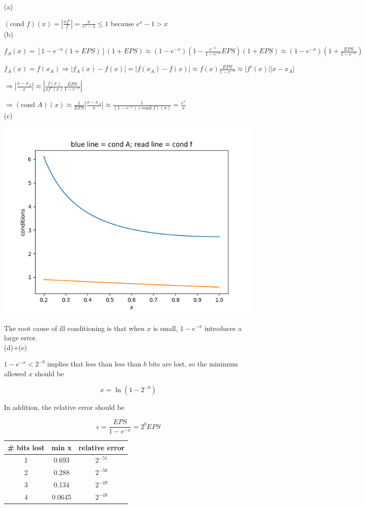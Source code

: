 \documentclass[10pt]{article}
\begin{document}
(a) 

$(\text{cond }f)(x)=|\frac{xf'}{f}|=\frac{x}{e^x-1}\leq 1$ because $e^x-1>x$\\

(b) 

$f_A(x)=[1-e^{-x}(1+EPS)](1+EPS)\approx (1-e^{-x})(1-\frac{e^{-x}}{1-e^{-x}}EPS)(1+EPS)\approx(1-e^{-x})(1+\frac{EPS}{1-e^{-x}})$

$f_A(x)=f(x_A)\Rightarrow |f_A(x)-f(x)|=|f(x_A)-f(x)|\approx f(x)\frac{EPS}{1-e^{-x}}\approx |f'(x)||x-x_A|$

$\Rightarrow |\frac{x-x_A}{x}|\approx|\frac{f(x)}{xf'(x)}\frac{EPS}{1-e^{-x}}|$

$\Rightarrow (\text{cond }A)(x)\approx \frac{1}{EPS}|\frac{x-x_A}{x}|\approx\frac{1}{(1-e^{-x})(\text{cond }f)(x)}=\frac{e^x}{x}$\\

(c)

\includegraphics[width=3 in]{p4.png}

The root cause of ill conditioning is that when $x$ is small, $1-e^{-x}$ introduces a large error.\\

(d)+(e)

$1-e^{-x}<2^{-b}$ implies that less than less than $b$ bits are lost, so the minimum allowed $x$ should be

$$x=\ln(1-2^{-b})$$

In addition, the relative error should be 

$$
\epsilon=\frac{EPS}{1-e^{-x}}=2^{b}EPS
$$

\begin{tabular}{ccc}
\hline
\# bits lost & min x & relative error\\
\hline
1 & 0.693 & $2^{-51}$\\
2 & 0.288 & $2^{-50}$\\
3 & 0.134 & $2^{-49}$\\
4 & 0.0645 & $2^{-48}$\\
\hline
\end{tabular}\\
\end{document}
